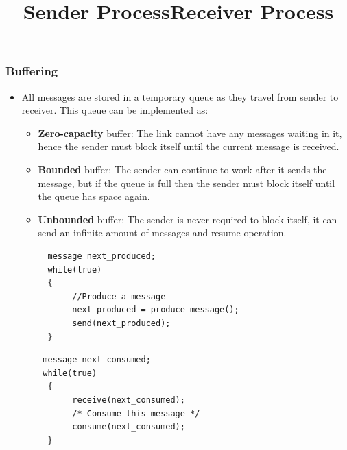 \documentclass{article}
\theoremstyle{plain}
\theoremstyle{definition}
\begin{document}
\subsubsection{Buffering}
\begin{itemize}
    \item All messages are stored in a temporary queue as they travel from sender to receiver. This queue can be implemented as:
    
    \begin{itemize}
        \item \textbf{Zero-capacity} buffer: The link cannot have any messages waiting in it, hence the sender must block itself until the current message is received. 
        
        \item \textbf{Bounded} buffer: The sender can continue to work after it sends the message, but if the queue is full then the sender must block itself until the queue has space again. 
        
        \item \textbf{Unbounded} buffer: The sender is never required to block itself, it can send an infinite amount of messages and resume operation.
    \end{itemize}
\end{itemize}

\begin{figure}[!h]
 \begin{minipage}{0.5\textwidth}
  \centering
  \begin{verbatim}
   message next_produced;
   while(true)
   {
        //Produce a message
        next_produced = produce_message();
        send(next_produced);
   }
  \end{verbatim}
  \title{Sender Process}
 \end{minipage}
 \begin{minipage}{0.5\textwidth}
  \centering
  \begin{verbatim}
  message next_consumed;
  while(true)
   {
        receive(next_consumed);
        /* Consume this message */
        consume(next_consumed);
   }
  \end{verbatim}
  \title{Receiver Process}
 \end{minipage}
\end{figure}
\end{document}
